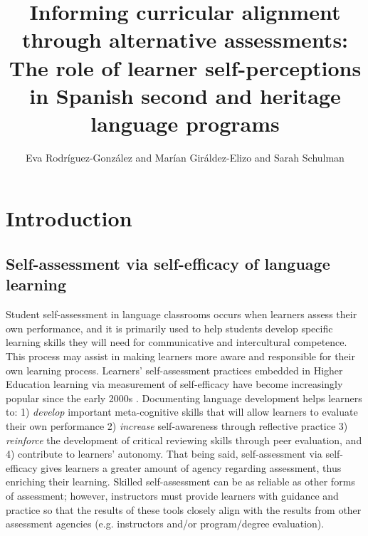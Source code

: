 \documentclass[output=paper]{langscibook}
\author{Eva Rodríguez-González\affiliation{University of New Mexico} and Marían Giráldez-Elizo\affiliation{Santa Fe Prep High School} and Sarah Schulman\affiliation{New Mexico International School}}
\title{Informing curricular alignment through alternative assessments: The role of learner self-perceptions in Spanish second and heritage language programs}
\begin{document}
\maketitle
{}
\section{{Introduction}}
\subsection{{Self-assessment via self-efficacy of language learning}}

\begin{sloppypar}
Student self-assessment in language classrooms occurs when learners assess their own performance, and it is primarily used to help students develop specific learning skills they will need for communicative and intercultural competence. This process may assist in making learners more aware and responsible for their own learning process. Learners' self-assessment practices embedded in Higher Education learning via measurement of self-efficacy have become increasingly popular since the early 2000s \citep{PapanthymouDarra2018}. Documenting language development helps learners to: 1) \emph{develop} important meta-cognitive skills that will allow learners to evaluate their own performance 2) \emph{increase} self-awareness through reflective practice 3) \emph{reinforce} the development of critical reviewing skills through peer evaluation, and 4) contribute to learners’ autonomy. That being said, self-assessment via self-efficacy gives learners a greater amount of agency regarding assessment, thus enriching their learning. Skilled self-assessment can be as reliable as other forms of assessment; however, instructors must provide learners with guidance and practice so that the results of these tools closely align with the results from other assessment agencies (e.g. instructors and/or program/degree evaluation).
\end{sloppypar}
\end{document}

